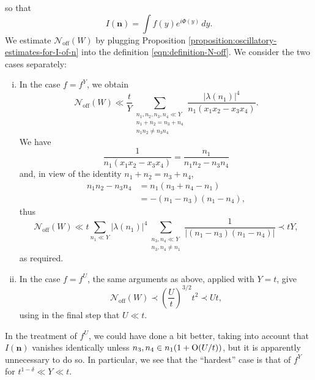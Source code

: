 \documentclass[reqno]{amsart} 
\begin{document}
so that
\begin{equation*}
  I(\mathbf{n}) = \int f(y) e ^{i \Phi(y) } \, d y.
\end{equation*}
We estimate $\mathcal{N}_{\mathrm{off}}(W)$ by plugging Proposition \ref{proposition:oscillatory-estimates-for-I-of-n} into the definition \eqref{eqn:definition-N-off}.  We consider the two cases separately:
\begin{enumerate}[(i)]
\item In the case $f = f^Y$, we obtain
  \begin{equation*}
  \mathcal{N} _{\mathrm{off}} (W) \ll
  \frac{t}{Y}
  \sum _{
    \substack{
      n _1, n _2, n _3, n _4 \ll Y  \\
      n _1 + n _2 = n _3  +  n_4  \\
      n _1 n _2 \neq n _3 n _4 
    }
  }
  \frac{\left\lvert \lambda (n _1 ) \right\rvert ^4 }{n_1 (x_1 x_2 - x_3 x_4) }.
\end{equation*}
We have
\begin{equation*}
  \frac{1}{ n _1  (x _1 x _2 - x _3 x _4 )}
  =
  \frac{n_1}{ n _1 n _2 - n _3 n _4 }
\end{equation*}
and, in view of the identity $n_1 + n_2 = n_3 + n_4$,
\begin{align*}
  n _1 n _2 - n _3  n _4 &=
                           n_1 (n_3 + n_4 - n_1) \\
                         &=
                           - (n _1 - n _3 ) (n _1 - n _4 ),
\end{align*}
thus
\begin{equation*}
  \mathcal{N} _{\mathrm{off}} (W) \ll
  t
  \sum _{n _1 \ll Y} \left\lvert \lambda(n_1) \right\rvert^4
  \sum _{
    \substack{
      n_3, n_4 \ll Y  \\
      n_3, n_4 \neq n_1      
    }
  }
  \frac{1}{|(n_1 - n_3)(n_1 - n_4)|} \prec t Y,
\end{equation*}
as required.
\item In the case $f = f^U$, the same arguments as above, applied with $Y = t$, give
  \begin{equation*}
    \mathcal{N} _{\mathrm{off}} (W) \prec \left( \frac{U}{t} \right) ^{3/2} t^2 \prec U t,
  \end{equation*}
  using in the final step that $U \ll t$.
\end{enumerate}
\begin{remark}
  In the treatment of $f^U$, we could have done a bit better, taking into account that $I(\mathbf{n})$ vanishes identically unless $n_3, n_4 \in  n _1 (1 + \operatorname{O}(U/t))$, but it is apparently unnecessary to do so.  In particular, we see that the ``hardest'' case is that of $f^Y$ for $t^{1-\delta} \ll Y \ll t$.
\end{remark}
\end{document}
